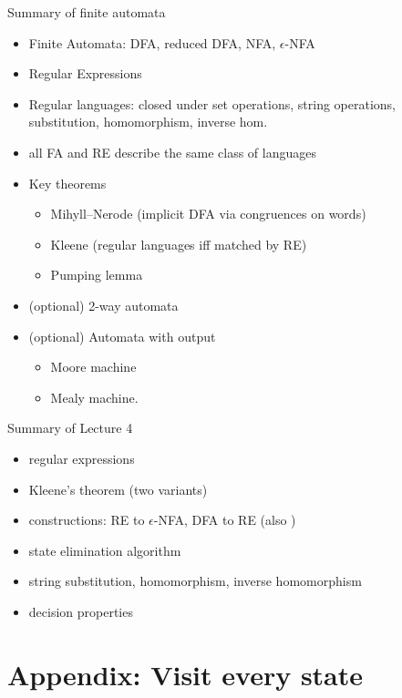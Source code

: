 \documentclass[handout]{beamer}
\begin{document}
\begin{frame}{Summary of finite automata}
\begin{itemize}
	\item Finite Automata: DFA, reduced DFA, NFA, $\epsilon$-NFA
    \item Regular Expressions
	\item Regular languages: closed under set operations, string operations, substitution, homomorphism, inverse hom.
	\item all FA and RE describe the same class of languages
	
	\item Key theorems
	
	\begin{itemize}
		\item Mihyll--Nerode (implicit DFA via congruences on words)
		\item Kleene (regular languages iff matched by RE)
		\item Pumping lemma
	\end{itemize}
\item (optional) 2-way automata
\item (optional) Automata with output
\begin{itemize}
	\item Moore machine
    \item Mealy machine.
\end{itemize}
\end{itemize}

\end{frame}


\begin{frame}{Summary of Lecture 4}

    \begin{itemize}
        \item regular expressions
        \item Kleene's theorem (two variants)
        \item constructions: RE to $\epsilon$-NFA, DFA to RE (also )
        \item state elimination algorithm
        \item string substitution, homomorphism, inverse homomorphism
        \item decision properties
    \end{itemize}    

\end{frame}


\section*{Appendix: Visit every state}
\end{document}
